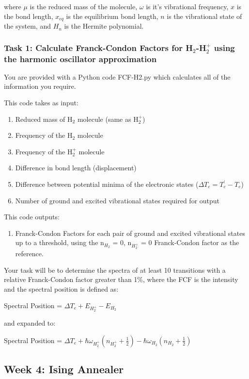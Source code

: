 \documentclass[12pt]{article}
\begin{document}
\noindent where $\mu$ is the reduced mass of the molecule, $\omega$ is it's vibrational frequency, $x$ is the bond length, $x_{eq}$ is the equilibrium bond length, $n$ is the vibrational state of the system, and $H_n$ is the Hermite polynomial.

\subsubsection{Task 1: Calculate Franck-Condon Factors for H$_2$-H$_2^+$ using the harmonic oscillator approximation}
You are provided with a Python code FCF-H2.py which calculates all of the information you require.

\noindent This code takes as input:
\begin{enumerate}
    \item Reduced mass of H$_2$ molecule (same as H$_2^+$)
    \item Frequency of the H$_2$ molecule
    \item Frequency of the H$_2^+$ molecule
    \item Difference in bond length (displacement)
    \item Difference between potential minima of the electronic states ($\Delta T_e = T_e^{'} - T_e$)
    \item Number of ground and excited vibrational states required for output
\end{enumerate}

\noindent This code outputs:
\begin{enumerate}
    \item Franck-Condon Factors for each pair of ground and excited vibrational states up to a threshold, using the n$_{H_2}$ = 0, n$_{H_2^+}$ = 0 Franck-Condon factor as the reference.
\end{enumerate}

\noindent Your task will be to determine the spectra of at least 10 transitions with a relative Franck-Condon factor greater than 1\%, where the FCF is the intensity and the spectral position is defined as:


Spectral Position = $\Delta T_e + E_{H_2^+} - E_{H_2}$

and expanded to:

Spectral Position = $\Delta T_e +\hbar\omega_{H_2^+}(n_{H_2^+} + \frac{1}{2}) - \hbar\omega_{H_2}(n_{H_2} + \frac{1}{2})$
\newpage

\subsection{Week 4: Ising Annealer}

\newpage



\end{document}
